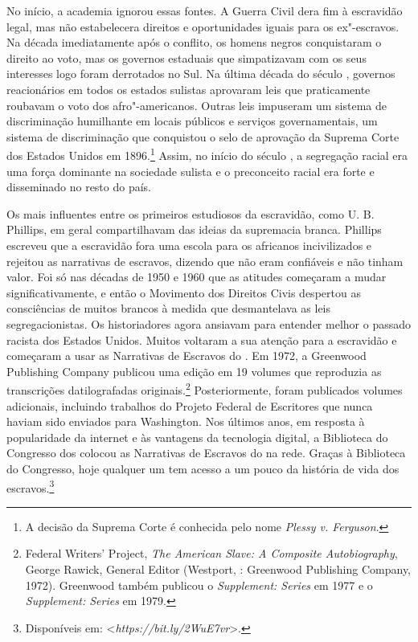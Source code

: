 No início, a academia ignorou essas fontes. A Guerra Civil dera fim à
escravidão legal, mas não estabelecera direitos e oportunidades iguais
para os ex"-escravos. Na década imediatamente após o conflito, os homens
negros conquistaram o direito ao voto, mas os governos estaduais que
simpatizavam com os seus interesses logo foram derrotados no Sul. Na
última década do século , governos reacionários em todos os estados
sulistas aprovaram leis que praticamente roubavam o voto dos
afro"-americanos. Outras leis impuseram um sistema de discriminação
humilhante em locais públicos e serviços governamentais, um sistema de
discriminação que conquistou o selo de aprovação da Suprema Corte dos
Estados Unidos em 1896.\footnote{A decisão da Suprema Corte é conhecida
  pelo nome \emph{Plessy v. Ferguson}.} Assim, no início do século , a
segregação racial era uma força dominante na sociedade sulista e o
preconceito racial era forte e disseminado no resto do país.

Os mais influentes entre os primeiros estudiosos da escravidão, como U.
B. Phillips, em geral compartilhavam das ideias da supremacia branca.
Phillips escreveu que a escravidão fora uma escola para os africanos
incivilizados e rejeitou as narrativas de escravos, dizendo que não eram
confiáveis e não tinham valor. Foi só nas décadas de 1950 e 1960 que as
atitudes começaram a mudar significativamente, e então o Movimento dos
Direitos Civis despertou as consciências de muitos brancos à medida que
desmantelava as leis segregacionistas. Os historiadores agora ansiavam
para entender melhor o passado racista dos Estados Unidos. Muitos
voltaram a sua atenção para a escravidão e começaram a usar as
Narrativas de Escravos do . Em 1972, a Greenwood Publishing Company
publicou uma edição em 19 volumes que reproduzia as transcrições
datilografadas originais.\footnote{Federal Writers' Project, \emph{The
  American Slave: A Composite Autobiography}, George Rawick, General
  Editor (Westport, : Greenwood Publishing Company, 1972). Greenwood
  também publicou o \emph{Supplement: Series } em 1977 e o
  \emph{Supplement: Series } em 1979.} Posteriormente, foram
publicados volumes adicionais, incluindo trabalhos do Projeto Federal de
Escritores que nunca haviam sido enviados para Washington. Nos últimos
anos, em resposta à popularidade da internet e às vantagens da
tecnologia digital, a Biblioteca do Congresso dos  colocou as
Narrativas de Escravos do  na rede. Graças à Biblioteca do Congresso,
hoje qualquer um tem acesso a um pouco da história de vida dos
escravos.\footnote{Disponíveis em:
  \textless{}\emph{https://bit.ly/2WuE7vr}\textgreater{}.}

